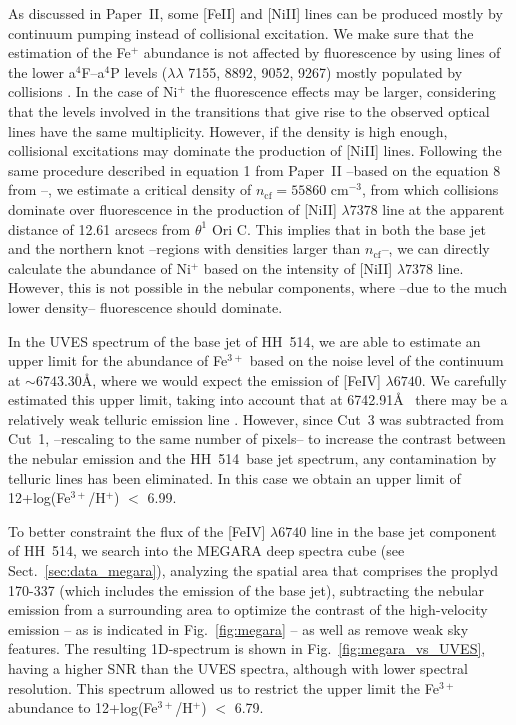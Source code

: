 \documentclass[fleqn,usenatbib]{mnras}
\begin{document}
As discussed in Paper~II, some [Fe\thinspace II] and [Ni\thinspace II] lines can be produced mostly by continuum pumping instead of collisional excitation. We make sure that the estimation of the Fe$^+$ abundance is not affected by fluorescence by using lines of the lower  a$^4$F--a$^4$P levels  ($\lambda \lambda$ 7155, 8892, 9052, 9267) mostly populated by collisions \citep{Baldwin96}. In the case of Ni$^+$ the fluorescence effects may be larger, considering that the  levels involved in the transitions that give rise to the observed optical lines have the same multiplicity. However, if the density is high enough, collisional excitations may dominate the production of [Ni\thinspace II] lines. Following the same procedure described in equation 1 from Paper~II --based on the equation 8 from \citet{Bautista96}--, we estimate a critical density of $n_{\text{cf}}= 55860 \text{ cm}^{-3}$, from which collisions dominate over  fluorescence in the production of [Ni\thinspace II] $\lambda 7378$ line at the apparent distance of 12.61 arcsecs from $\theta^1$ Ori C. This implies that in both the base jet and the northern knot --regions with densities larger than $n_{\text{cf}}$--, we can directly calculate the abundance of Ni$^{+}$ based on the intensity of [Ni\thinspace II] $\lambda 7378$ line. However, this is not possible in the nebular components, where --due to the much lower density-- fluorescence should dominate.

In the UVES spectrum of the base jet of HH~514, we are able to estimate an upper limit for the abundance of Fe$^{3+}$ based on the noise level of the continuum at $\sim 6743.30$\AA, where we would expect the emission of [Fe\thinspace IV] $\lambda6740$. We carefully estimated this upper limit, taking into account that at 6742.91\AA~ there may be a relatively weak telluric emission line \citep[][]{Hanuschik03}. However, since Cut~3 was subtracted from Cut~1, --rescaling to the same number of pixels-- to increase the contrast between the nebular emission and the HH~514~base jet spectrum, any contamination by telluric lines has been eliminated. In this case we obtain an upper limit of 12+log(Fe$^{3+}$/H$^+$) $<$ 6.99.

To better constraint the flux of the [Fe\thinspace IV] $\lambda6740$ line in the base jet component of HH~514, we search into the MEGARA deep spectra cube (see Sect.~\ref{sec:data_megara}), analyzing the spatial area that comprises the proplyd 170-337 (which includes the emission of the base jet), subtracting the nebular emission from a surrounding area to optimize the contrast of the high-velocity emission -- as is indicated in Fig.~\ref{fig:megara} -- as well as remove weak sky features. The resulting 1D-spectrum is shown in Fig.~\ref{fig:megara_vs_UVES}, having a higher SNR than the UVES spectra, although with lower spectral resolution. This spectrum allowed us to restrict the upper limit the Fe$^{3+}$ abundance to   12+log(Fe$^{3+}$/H$^+$) $<$ 6.79.
\end{document}
